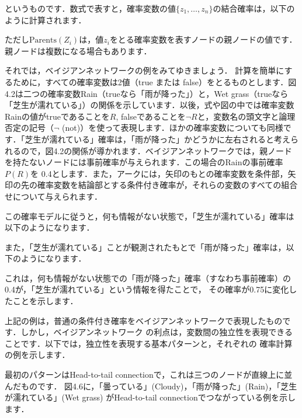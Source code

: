 というものです．数式で表すと，確率変数の値$\{z_1,\dots,z_n\}$の結合確率は，以下のように計算されます．


ただし$\mbox{Parents}(Z_i)$は，値$z_i$をとる確率変数を表すノードの親ノードの値です．親ノードは複数になる場合もあります．


それでは，ベイジアンネットワークの例をみてゆきましょう．
計算を簡単にするために，すべての確率変数は2値（true または false）をとるものとします．図4.2は二つの確率変数Rain（trueなら「雨が降った」）と，Wet grass（trueなら「芝生が濡れている」）の関係を示しています．以後，式や図の中では確率変数Rainの値がtrueであることを$R$, falseであることを$\lnot R$と，変数名の頭文字と論理否定の記号（$\lnot$ (not)）を使って表現します．ほかの確率変数についても同様です．「芝生が濡れている」確率は，「雨が降った」かどうかに左右されると考えられるので，図4.2の関係が導かれます．ベイジアンネットワークでは，親ノードを持たないノードには事前確率が与えられます．この場合のRainの事前確率$P(R)$を
0.4とします．また，アークには，矢印のもとの確率変数を条件部，矢印の先の確率変数を結論部とする条件付き確率が，それらの変数のすべての組合せについて与えられます．



この確率モデルに従うと，何も情報がない状態で，「芝生が濡れている」確率は以下のようになります．


また，「芝生が濡れている」ことが観測されたもとで「雨が降った」確率は，以下のようになります．


これは，何も情報がない状態での「雨が降った」確率（すなわち事前確率）の0.4が，「芝生が濡れている」という情報を得たことで，
その確率が0.75に変化したことを示します．


上記の例は，普通の条件付き確率をベイジアンネットワークで表現したものです．しかし，ベイジアンネットワーク
の利点は，変数間の独立性を表現できることです．以下では，独立性を表現する基本パターンと，それぞれの
確率計算の例を示します．

最初のパターンはHead-to-tail connectionで，これは三つのノードが直線上に並んだものです．
図4.6に，「曇っている」(Cloudy)，「雨が降った」(Rain)，「芝生が濡れている」(Wet grass)
がHead-to-tail connectionでつながっている例を示します．


